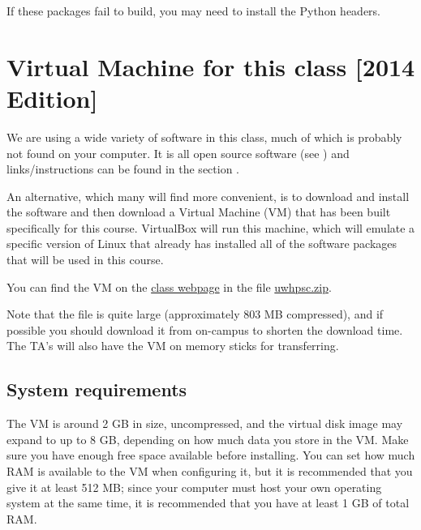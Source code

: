\documentclass[letterpaper,10pt,english]{sphinxmanual}
\begin{document}
If these packages fail to build, you may need to install the Python
headers.


\section{Virtual Machine for this class {[}2014 Edition{]}}
\label{vm:virtual-machine-for-this-class-2014-edition}\label{vm::doc}\label{vm:vm}
We are using a wide variety of software in this class, much of which is
probably not found on your computer.  It is all open source software (see
) and links/instructions
can be found in the section {\hyperref[software_installation:software\string-installation]{}}.

An alternative, which many will find more convenient, is to download and
install the \label{vm:id1}{\hyperref[biblio:virtualbox]{\crossref{{[}VirtualBox{]}}}} software and then download a Virtual Machine (VM)
that has been built specifically for this course.  VirtualBox will run this
machine, which will emulate a specific version of Linux that already has
installed all of the software packages that will be used in this course.

You can find the VM on the \href{http://faculty.washington.edu/rjl/classes/am583s2014/}{class
webpage}
in the file \href{http://faculty.washington.edu/rjl/classes/am583s2014/uwhpsc.zip}{uwhpsc.zip}.

Note that the file is quite
large (approximately 803 MB compressed), and if possible you should
download it from on-campus to shorten the download time.  The TA's will also
have the VM on memory sticks for transferring.


\subsection{System requirements}
\label{vm:system-requirements}
The VM is around 2 GB in size, uncompressed, and the virtual disk
image may expand to up to 8 GB, depending on how much data you store
in the VM.  Make sure you have enough free space available before
installing.  You can set how much RAM is available to the VM when
configuring it, but it is recommended that you give it at least 512
MB; since your computer must host your own operating system at the
same time, it is recommended that you have at least 1 GB of total RAM.
\end{document}
